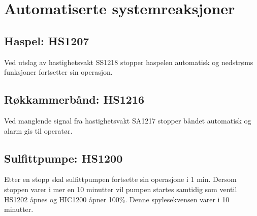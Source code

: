 \section{Automatiserte systemreaksjoner}
\subsection{Haspel: HS1207}
Ved utslag av hastighetsvakt SS1218 stopper haspelen automatisk og nedstrøms funksjoner fortsetter sin operasjon.

\subsection{Røkkammerbånd: HS1216}
Ved manglende signal fra hastighetsvakt SA1217 stopper båndet automatisk og alarm gis til operatør.

\subsection{Sulfittpumpe: HS1200}
Etter en stopp skal sulfittpumpen fortsette sin operasjone i 1 min. Dersom stoppen varer i mer en 10 minutter vil pumpen startes samtidig som ventil HS1202 åpnes og HIC1200 åpner 100\%. Denne spylesekvensen varer i 10 minutter.
